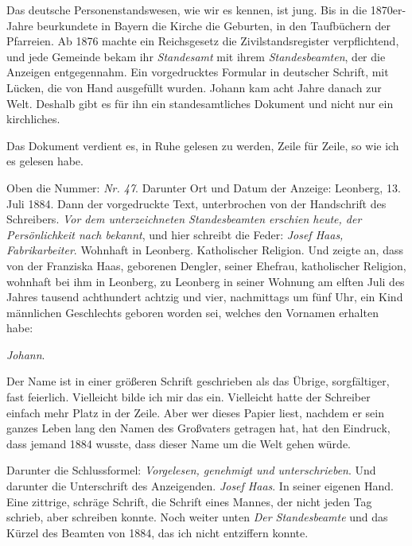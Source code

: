 \documentclass[
  ngerman,
  11pt,
  openany]{book}
\begin{document}
Das deutsche Personenstandswesen, wie wir es kennen, ist jung. Bis in
die 1870er-Jahre beurkundete in Bayern die Kirche die Geburten, in den
Taufbüchern der Pfarreien. Ab 1876 machte ein Reichsgesetz die
Zivilstandsregister verpflichtend, und jede Gemeinde bekam ihr
\emph{Standesamt} mit ihrem \emph{Standesbeamten}, der die Anzeigen
entgegennahm. Ein vorgedrucktes Formular in deutscher Schrift, mit
Lücken, die von Hand ausgefüllt wurden. Johann kam acht Jahre danach zur
Welt. Deshalb gibt es für ihn ein standesamtliches Dokument und nicht
nur ein kirchliches.

Das Dokument verdient es, in Ruhe gelesen zu werden, Zeile für Zeile, so
wie ich es gelesen habe.

Oben die Nummer: \emph{Nr. 47}. Darunter Ort und Datum der Anzeige:
Leonberg, 13. Juli 1884. Dann der vorgedruckte Text, unterbrochen von
der Handschrift des Schreibers. \emph{Vor dem unterzeichneten
Standesbeamten erschien heute, der Persönlichkeit nach bekannt}, und
hier schreibt die Feder: \emph{Josef Haas, Fabrikarbeiter}. Wohnhaft in
Leonberg. Katholischer Religion. Und zeigte an, dass von der Franziska
Haas, geborenen Dengler, seiner Ehefrau, katholischer Religion, wohnhaft
bei ihm in Leonberg, zu Leonberg in seiner Wohnung am elften Juli des
Jahres tausend achthundert achtzig und vier, nachmittags um fünf Uhr,
ein Kind männlichen Geschlechts geboren worden sei, welches den Vornamen
erhalten habe:

\emph{Johann}.

Der Name ist in einer größeren Schrift geschrieben als das Übrige,
sorgfältiger, fast feierlich. Vielleicht bilde ich mir das ein.
Vielleicht hatte der Schreiber einfach mehr Platz in der Zeile. Aber wer
dieses Papier liest, nachdem er sein ganzes Leben lang den Namen des
Großvaters getragen hat, hat den Eindruck, dass jemand 1884 wusste, dass
dieser Name um die Welt gehen würde.

Darunter die Schlussformel: \emph{Vorgelesen, genehmigt und
unterschrieben}. Und darunter die Unterschrift des Anzeigenden.
\emph{Josef Haas}. In seiner eigenen Hand. Eine zittrige, schräge
Schrift, die Schrift eines Mannes, der nicht jeden Tag schrieb, aber
schreiben konnte. Noch weiter unten \emph{Der Standesbeamte} und das
Kürzel des Beamten von 1884, das ich nicht entziffern konnte.
\end{document}
